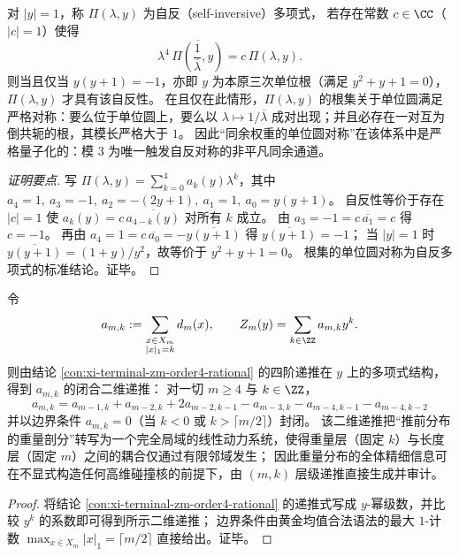\begin{conclusion}[自反型同余通道的唯一性：仅 \(y^2+y+1=0\) 触发单位圆对称]\label{con:xi-terminal-zm-self-inversive-unique}
对 \(|y|=1\)，称 \(\Pi(\lambda,y)\) 为自反（self-inversive）多项式，
若存在常数 \(c\in\CC\)（\(|c|=1\)）使得
\[
\lambda^4\,\overline{\Pi\!\left(\frac{1}{\overline{\lambda}},y\right)}=c\,\Pi(\lambda,y).
\]
则当且仅当 \(y(y+1)=-1\)，亦即 \(y\) 为本原三次单位根（满足 \(y^2+y+1=0\)），\(\Pi(\lambda,y)\) 才具有该自反性。
在且仅在此情形，\(\Pi(\lambda,y)\) 的根集关于单位圆满足严格对称：要么位于单位圆上，要么以
\(\lambda\mapsto 1/\overline{\lambda}\) 成对出现；并且必存在一对互为倒共轭的根，其模长严格大于 \(1\)。
因此“同余权重的单位圆对称”在该体系中是严格量子化的：模 \(3\) 为唯一触发自反对称的非平凡同余通道。
\end{conclusion}
\begin{proof}[证明要点]
写
\(
\Pi(\lambda,y)=\sum_{k=0}^{4}a_k(y)\lambda^k
\)，其中
\(
a_4=1,\ a_3=-1,\ a_2=-(2y+1),\ a_1=1,\ a_0=y(y+1)
\)。
自反性等价于存在 \(|c|=1\) 使 \(a_k(y)=c\,\overline{a_{4-k}(y)}\) 对所有 \(k\) 成立。
由 \(a_3=-1=c\,\overline{a_1}=c\) 得 \(c=-1\)。
再由 \(a_4=1=c\,\overline{a_0}=-\overline{y(y+1)}\) 得 \(\overline{y(y+1)}=-1\)；
当 \(|y|=1\) 时 \(\overline{y(y+1)}=(1+y)/y^2\)，故等价于 \(y^2+y+1=0\)。
根集的单位圆对称为自反多项式的标准结论。证毕。
\end{proof}

\begin{conclusion}\label{con:xi-terminal-zm-2d-recurrence-amk}
令
\[
a_{m,k}:=\sum_{\substack{x\in X_m\\ |x|_1=k}} d_m(x),
\qquad
Z_m(y)=\sum_{k\in\ZZ} a_{m,k}y^k .
\]
则由结论 \ref{con:xi-terminal-zm-order4-rational} 的四阶递推在 \(y\) 上的多项式结构，得到 \(a_{m,k}\) 的闭合二维递推：
对一切 \(m\ge 4\) 与 \(k\in\ZZ\)，
\[
\boxed{\;
a_{m,k}=a_{m-1,k}+a_{m-2,k}+2a_{m-2,k-1}-a_{m-3,k}-a_{m-4,k-1}-a_{m-4,k-2}\;}
\]
并以边界条件 \(a_{m,k}=0\)（当 \(k<0\) 或 \(k>\lceil m/2\rceil\)）封闭。
该二维递推把“推前分布的重量剖分”转写为一个完全局域的线性动力系统，使得重量层（固定 \(k\)）与长度层（固定 \(m\)）之间的耦合仅通过有限邻域发生；
因此重量分布的全体精细信息可在不显式构造任何高维碰撞核的前提下，由 \((m,k)\) 层级递推直接生成并审计。
\end{conclusion}
\begin{proof}
将结论 \ref{con:xi-terminal-zm-order4-rational} 的递推式写成 \(y\)-幂级数，并比较 \(y^k\) 的系数即可得到所示二维递推；
边界条件由黄金均值合法语法的最大 \(1\)-计数 \(\max_{x\in X_m}|x|_1=\lceil m/2\rceil\) 直接给出。证毕。
\end{proof}

